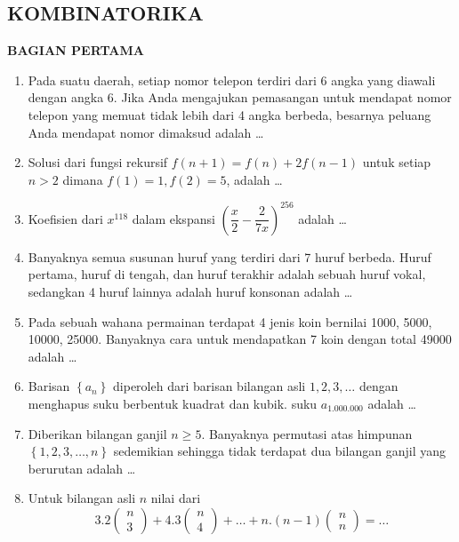 \documentclass[12pt,twoside]{article}
\begin{document}
\subsection{KOMBINATORIKA}
\textbf{BAGIAN PERTAMA}
\begin{enumerate}
	\item Pada suatu daerah, setiap nomor telepon terdiri dari 6 angka yang diawali dengan angka 6. Jika Anda mengajukan pemasangan untuk mendapat nomor telepon yang memuat tidak lebih dari 4 angka berbeda, besarnya peluang Anda mendapat nomor dimaksud adalah \dots

	\item Solusi dari fungsi rekursif $f(n+1)=f(n)+2f(n-1)$ untuk setiap $n>2$ dimana $f(1)=1, f(2)=5$, adalah \dots

	\item Koefisien dari $x^{118}$ dalam ekspansi $\left( \dfrac{x}{2}-\dfrac{2}{7x} \right)^{256}$ adalah \dots

	\item Banyaknya semua susunan huruf yang terdiri dari 7 huruf berbeda. Huruf pertama, huruf di tengah, dan huruf terakhir adalah sebuah huruf vokal, sedangkan 4 huruf lainnya adalah huruf konsonan adalah \dots

	\item Pada sebuah wahana permainan terdapat 4 jenis koin bernilai 1000, 5000, 10000, 25000. Banyaknya cara untuk mendapatkan 7 koin dengan total 49000 adalah \dots

	\item Barisan $\left\lbrace a_n \right\rbrace$  diperoleh dari barisan bilangan asli $1,2,3,\dots$ dengan menghapus suku berbentuk kuadrat dan kubik. suku $a_{1.000.000}$ adalah \dots

	\item Diberikan bilangan ganjil $n \geq 5.$ Banyaknya permutasi atas himpunan $\left\lbrace 1,2,3,\dots,n \right\rbrace$ sedemikian sehingga tidak terdapat dua bilangan ganjil yang berurutan adalah \dots

	\item Untuk bilangan asli $n$ nilai dari $$3.2\left( \begin{array}{c}
			      n \\3
		      \end{array} \right)+4.3\left( \begin{array}{c}
			      n \\4
		      \end{array} \right)+\dots+n.(n-1)\left( \begin{array}{c}
			      n \\n
		      \end{array} \right) = \dots$$
\end{enumerate}
\end{document}
